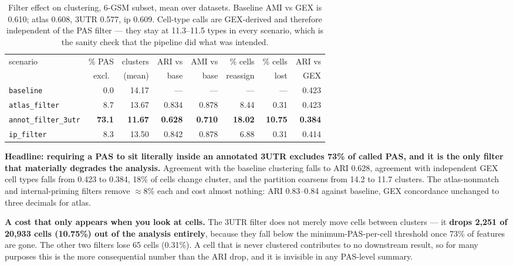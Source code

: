 \documentclass[11pt,a4paper]{article}
\begin{document}
\begin{table}[htbp]
  \centering
  \small
  \begin{tabular}{lrrrrrrr}
    \toprule
    scenario & \% PAS & clusters & ARI vs & AMI vs & \% cells & \% cells & ARI vs \\
             & excl.\ & (mean)   & base   & base   & reassign & lost     & GEX \\
    \midrule
    \texttt{baseline}          &  0.0 & 14.17 & ---    & ---    & ---   & ---   & 0.423 \\
    \texttt{atlas\_filter}     &  8.7 & 13.67 & 0.834 & 0.878 &  8.44 &  0.31 & 0.423 \\
    \texttt{annot\_filter\_3utr} & \textbf{73.1} & \textbf{11.67} & \textbf{0.628} & \textbf{0.710} & \textbf{18.02} & \textbf{10.75} & \textbf{0.384} \\
    \texttt{ip\_filter}        &  8.3 & 13.50 & 0.842 & 0.878 &  6.88 &  0.31 & 0.414 \\
    \bottomrule
  \end{tabular}
  \caption{Filter effect on clustering, 6-GSM subset, mean over datasets.
    Baseline AMI vs GEX is 0.610; atlas 0.608, 3\textquotesingle{}UTR 0.577, ip
    0.609. Cell-type calls are GEX-derived and therefore independent of the PAS
    filter --- they stay at 11.3--11.5 types in every scenario, which is the
    sanity check that the pipeline did what was intended.}
  \label{tab:filter_effect_result}
\end{table}

\textbf{Headline: requiring a PAS to sit literally inside an annotated
3\textquotesingle{}UTR excludes 73\% of called PAS, and it is the only filter
that materially degrades the analysis.} Agreement with the baseline clustering
falls to ARI 0.628, agreement with independent GEX cell types falls from 0.423 to
0.384, 18\% of cells change cluster, and the partition coarsens from 14.2 to 11.7
clusters. The atlas-nonmatch and internal-priming filters remove $\approx$8\%
each and cost almost nothing: ARI 0.83--0.84 against baseline, GEX concordance
unchanged to three decimals for atlas.

\textbf{A cost that only appears when you look at cells.} The
3\textquotesingle{}UTR filter does not merely move cells between clusters --- it
\textbf{drops 2,251 of 20,933 cells (10.75\%) out of the analysis entirely},
because they fall below the minimum-PAS-per-cell threshold once 73\% of features
are gone. The other two filters lose 65 cells (0.31\%). A cell that is never
clustered contributes to no downstream result, so for many purposes this is the
more consequential number than the ARI drop, and it is invisible in any
PAS-level summary.
\end{document}
